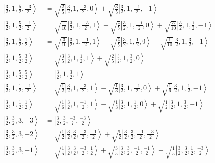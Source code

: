 \documentclass{report}
\newcommand{\ket}[1]{\left| #1 \right>} %
\begin{document}
\begin{align*}
\ket{ \frac{3}{2} ,  1 ,  \frac{5}{2} ,  \frac{-3}{2}  } &=  \sqrt{  \frac{2}{5}  } \ket{ \frac{3}{2} ,  1 ,  \frac{-3}{2} ,  0  } + \sqrt{  \frac{3}{5}  } \ket{ \frac{3}{2} ,  1 ,  \frac{-1}{2} ,  -1  } \\
\ket{ \frac{3}{2} ,  1 ,  \frac{5}{2} ,  \frac{-1}{2}  } &=  \sqrt{  \frac{1}{10}  } \ket{ \frac{3}{2} ,  1 ,  \frac{-3}{2} ,  1  } + \sqrt{  \frac{3}{5}  } \ket{ \frac{3}{2} ,  1 ,  \frac{-1}{2} ,  0  } + \sqrt{  \frac{3}{10}  } \ket{ \frac{3}{2} ,  1 ,  \frac{1}{2} ,  -1  } \\
\ket{ \frac{3}{2} ,  1 ,  \frac{5}{2} ,  \frac{1}{2}  } &=  \sqrt{  \frac{3}{10}  } \ket{ \frac{3}{2} ,  1 ,  \frac{-1}{2} ,  1  } + \sqrt{  \frac{3}{5}  } \ket{ \frac{3}{2} ,  1 ,  \frac{1}{2} ,  0  } + \sqrt{  \frac{1}{10}  } \ket{ \frac{3}{2} ,  1 ,  \frac{3}{2} ,  -1  } \\
\ket{ \frac{3}{2} ,  1 ,  \frac{5}{2} ,  \frac{3}{2}  } &=  \sqrt{  \frac{3}{5}  } \ket{ \frac{3}{2} ,  1 ,  \frac{1}{2} ,  1  } + \sqrt{  \frac{2}{5}  } \ket{ \frac{3}{2} ,  1 ,  \frac{3}{2} ,  0  } \\
\ket{ \frac{3}{2} ,  1 ,  \frac{5}{2} ,  \frac{5}{2}  } &=  \ket{ \frac{3}{2} ,  1 ,  \frac{3}{2} ,  1  } \\
\ket{ \frac{3}{2} ,  1 ,  \frac{1}{2} ,  \frac{-1}{2}  } &=  \sqrt{  \frac{1}{2}  } \ket{ \frac{3}{2} ,  1 ,  \frac{-3}{2} ,  1  } - \sqrt{  \frac{1}{3}  } \ket{ \frac{3}{2} ,  1 ,  \frac{-1}{2} ,  0  } + \sqrt{  \frac{1}{6}  } \ket{ \frac{3}{2} ,  1 ,  \frac{1}{2} ,  -1  } \\
\ket{ \frac{3}{2} ,  1 ,  \frac{1}{2} ,  \frac{1}{2}  } &=  \sqrt{  \frac{1}{6}  } \ket{ \frac{3}{2} ,  1 ,  \frac{-1}{2} ,  1  } - \sqrt{  \frac{1}{3}  } \ket{ \frac{3}{2} ,  1 ,  \frac{1}{2} ,  0  } + \sqrt{  \frac{1}{2}  } \ket{ \frac{3}{2} ,  1 ,  \frac{3}{2} ,  -1  } \\
\ket{ \frac{3}{2} ,  \frac{3}{2} ,  3 ,  -3  } &=  \ket{ \frac{3}{2} ,  \frac{3}{2} ,  \frac{-3}{2} ,  \frac{-3}{2}  } \\
\ket{ \frac{3}{2} ,  \frac{3}{2} ,  3 ,  -2  } &=  \sqrt{  \frac{1}{2}  } \ket{ \frac{3}{2} ,  \frac{3}{2} ,  \frac{-3}{2} ,  \frac{-1}{2}  } + \sqrt{  \frac{1}{2}  } \ket{ \frac{3}{2} ,  \frac{3}{2} ,  \frac{-1}{2} ,  \frac{-3}{2}  } \\
\ket{ \frac{3}{2} ,  \frac{3}{2} ,  3 ,  -1  } &=  \sqrt{  \frac{1}{5}  } \ket{ \frac{3}{2} ,  \frac{3}{2} ,  \frac{-3}{2} ,  \frac{1}{2}  } + \sqrt{  \frac{3}{5}  } \ket{ \frac{3}{2} ,  \frac{3}{2} ,  \frac{-1}{2} ,  \frac{-1}{2}  } + \sqrt{  \frac{1}{5}  } \ket{ \frac{3}{2} ,  \frac{3}{2} ,  \frac{1}{2} ,  \frac{-3}{2}  } \\

\end{align*}
\end{document}
